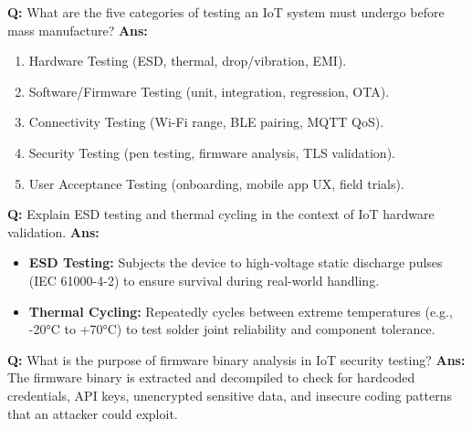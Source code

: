 \documentclass[10pt,a4paper,twocolumn]{article}
\begin{document}
\begin{tcolorbox}[
  colback=white,
  colframe=UnitColorNine,
  colbacktitle=gray!10!white,
  coltitle=black,
  fonttitle=\bfseries\sffamily\small,
  title={Unit IX $\bullet$ Card 5},
  boxrule=1.2pt,
  arc=2mm,
  outer arc=2mm,
  boxsep=1.5mm,
  top=1mm,
  bottom=1mm,
  left=1.5mm,
  right=1.5mm,
  before skip=2.5mm,
  after skip=2.5mm
]
\textbf{Q:} What are the five categories of testing an IoT system must undergo before mass manufacture?
\tcbline
\textbf{Ans:} \begin{enumerate}
  \item Hardware Testing (ESD, thermal, drop/vibration, EMI).
  \item Software/Firmware Testing (unit, integration, regression, OTA).
  \item Connectivity Testing (Wi-Fi range, BLE pairing, MQTT QoS).
  \item Security Testing (pen testing, firmware analysis, TLS validation).
  \item User Acceptance Testing (onboarding, mobile app UX, field trials).
\end{enumerate}
\end{tcolorbox}


\begin{tcolorbox}[
  colback=white,
  colframe=UnitColorNine,
  colbacktitle=gray!10!white,
  coltitle=black,
  fonttitle=\bfseries\sffamily\small,
  title={Unit IX $\bullet$ Card 6},
  boxrule=1.2pt,
  arc=2mm,
  outer arc=2mm,
  boxsep=1.5mm,
  top=1mm,
  bottom=1mm,
  left=1.5mm,
  right=1.5mm,
  before skip=2.5mm,
  after skip=2.5mm
]
\textbf{Q:} Explain ESD testing and thermal cycling in the context of IoT hardware validation.
\tcbline
\textbf{Ans:} \begin{itemize}
  \item \textbf{ESD Testing:} Subjects the device to high-voltage static discharge pulses (IEC 61000-4-2) to ensure survival during real-world handling.
  \item \textbf{Thermal Cycling:} Repeatedly cycles between extreme temperatures (e.g., -20°C to +70°C) to test solder joint reliability and component tolerance.
\end{itemize}
\end{tcolorbox}


\begin{tcolorbox}[
  colback=white,
  colframe=UnitColorNine,
  colbacktitle=gray!10!white,
  coltitle=black,
  fonttitle=\bfseries\sffamily\small,
  title={Unit IX $\bullet$ Card 7},
  boxrule=1.2pt,
  arc=2mm,
  outer arc=2mm,
  boxsep=1.5mm,
  top=1mm,
  bottom=1mm,
  left=1.5mm,
  right=1.5mm,
  before skip=2.5mm,
  after skip=2.5mm
]
\textbf{Q:} What is the purpose of firmware binary analysis in IoT security testing?
\tcbline
\textbf{Ans:} The firmware binary is extracted and decompiled to check for hardcoded credentials, API keys, unencrypted sensitive data, and insecure coding patterns that an attacker could exploit.
\end{tcolorbox}
\end{document}
